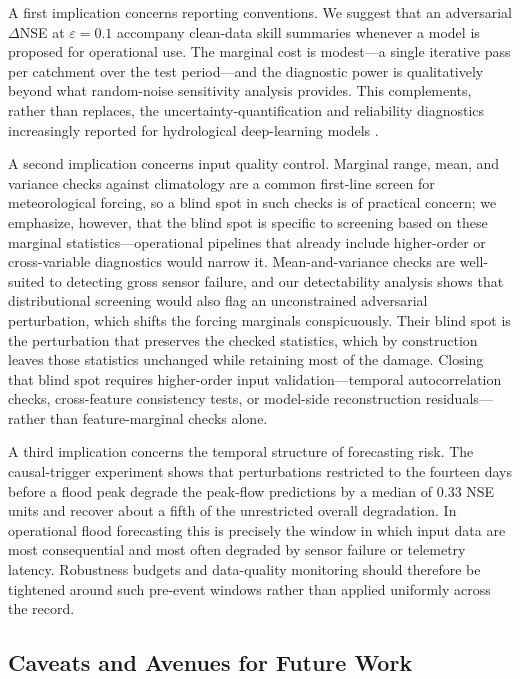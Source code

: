 \documentclass[final]{agujournal2019}
\begin{document}
A first implication concerns reporting conventions. We suggest that an adversarial $\Delta$NSE at $\varepsilon = 0.1$ accompany clean-data skill summaries whenever a model is proposed for operational use. The marginal cost is modest---a single iterative pass per catchment over the test period---and the diagnostic power is qualitatively beyond what random-noise sensitivity analysis provides. This complements, rather than replaces, the uncertainty-quantification and reliability diagnostics increasingly reported for hydrological deep-learning models \cite{Klotz2022, Frame2022, Lees2021}.

A second implication concerns input quality control. Marginal range, mean, and variance checks against climatology are a common first-line screen for meteorological forcing, so a blind spot in such checks is of practical concern; we emphasize, however, that the blind spot is specific to screening based on these marginal statistics---operational pipelines that already include higher-order or cross-variable diagnostics would narrow it. Mean-and-variance checks are well-suited to detecting gross sensor failure, and our detectability analysis shows that distributional screening would also flag an unconstrained adversarial perturbation, which shifts the forcing marginals conspicuously. Their blind spot is the perturbation that preserves the checked statistics, which by construction leaves those statistics unchanged while retaining most of the damage. Closing that blind spot requires higher-order input validation---temporal autocorrelation checks, cross-feature consistency tests, or model-side reconstruction residuals---rather than feature-marginal checks alone.

A third implication concerns the temporal structure of forecasting risk. The causal-trigger experiment shows that perturbations restricted to the fourteen days before a flood peak degrade the peak-flow predictions by a median of 0.33 NSE units and recover about a fifth of the unrestricted overall degradation. In operational flood forecasting this is precisely the window in which input data are most consequential and most often degraded by sensor failure or telemetry latency. Robustness budgets and data-quality monitoring should therefore be tightened around such pre-event windows rather than applied uniformly across the record.

\subsection{Caveats and Avenues for Future Work}
\end{document}
